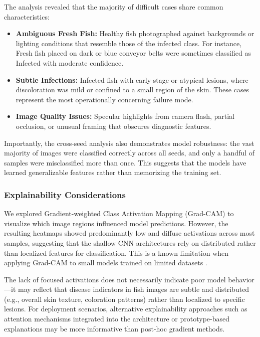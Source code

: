 \documentclass[12pt,a4paper]{article}
\begin{document}
The analysis revealed that the majority of difficult cases share common characteristics:
\begin{itemize}
    \item \textbf{Ambiguous Fresh Fish:} Healthy fish photographed against backgrounds or lighting conditions that resemble those of the infected class. For instance, Fresh fish placed on dark or blue conveyor belts were sometimes classified as Infected with moderate confidence.
    \item \textbf{Subtle Infections:} Infected fish with early-stage or atypical lesions, where discoloration was mild or confined to a small region of the skin. These cases represent the most operationally concerning failure mode.
    \item \textbf{Image Quality Issues:} Specular highlights from camera flash, partial occlusion, or unusual framing that obscures diagnostic features.
\end{itemize}

Importantly, the cross-seed analysis also demonstrates model robustness: the vast majority of images were classified correctly across all seeds, and only a handful of samples were misclassified more than once. This suggests that the models have learned generalizable features rather than memorizing the training set.

\subsubsection{Explainability Considerations}
We explored Gradient-weighted Class Activation Mapping (Grad-CAM) \citep{selvaraju2017gradcamdidsaythat} to visualize which image regions influenced model predictions. However, the resulting heatmaps showed predominantly low and diffuse activations across most samples, suggesting that the shallow CNN architectures rely on distributed rather than localized features for classification. This is a known limitation when applying Grad-CAM to small models trained on limited datasets \citep{Lapuschkin2019}.

The lack of focused activations does not necessarily indicate poor model behavior---it may reflect that disease indicators in fish images are subtle and distributed (e.g., overall skin texture, coloration patterns) rather than localized to specific lesions. For deployment scenarios, alternative explainability approaches such as attention mechanisms integrated into the architecture \citep{10138194} or prototype-based explanations may be more informative than post-hoc gradient methods.
\end{document}
